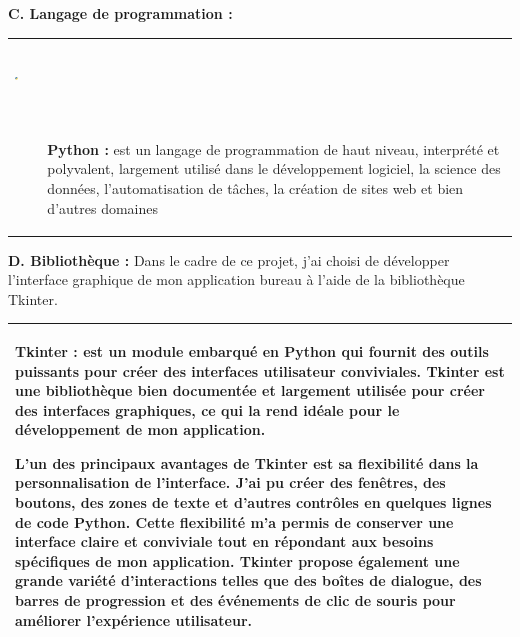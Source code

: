 \documentclass[12pt]{report}
\begin{document}
\textbf{C. Langage de programmation :}
\begin{table}[H]
\def\arraystretch{0.5}
\begin{tabular}{||p{5cm}||p{12cm}||} 
   \hline
   \hline
   \vspace{1.5cm}
   \centering
   \includegraphics[width=0.15\textwidth, height=20mm]{python.png}\\
   \vspace{0.5cm}
   &
   \begin{doublespace}
   \vspace{1cm}
    \textbf{Python :} est un langage de programmation de haut niveau, interprété et polyvalent, largement utilisé dans le développement logiciel, la science des données, l'automatisation de tâches, la création de sites web et bien d'autres domaines\end{doublespace}
   \\
   \hline
   \hline
  
\end{tabular}

\end{table}

\textbf{D. Bibliothèque :}
Dans le cadre de ce projet, j'ai choisi de développer l'interface graphique de mon application bureau à l'aide de la bibliothèque Tkinter.
\begin{table}[H]

\def\arraystretch{0.8}
\begin{tabular}{||p{17cm}||}    
   \hline
   \hline
   \vspace{0.2cm}
 
   \begin{doublespace}
    \textbf{Tkinter :} est un module embarqué en Python qui fournit des outils puissants pour créer des interfaces utilisateur conviviales. Tkinter est une bibliothèque bien documentée et largement utilisée pour créer des interfaces graphiques, ce qui la rend idéale pour le développement de mon application.

L'un des principaux avantages de Tkinter est sa flexibilité dans la personnalisation de l'interface. J'ai pu créer des fenêtres, des boutons, des zones de texte et d'autres contrôles en quelques lignes de code Python. Cette flexibilité m'a permis de conserver une interface claire et conviviale tout en répondant aux besoins spécifiques de mon application. Tkinter propose également une grande variété d'interactions telles que des boîtes de dialogue, des barres de progression et des événements de clic de souris pour améliorer l'expérience utilisateur. \end{doublespace}
   \\
   \hline
   \hline
\end{tabular}
\end{table}
\end{document}
